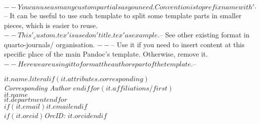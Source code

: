 $-- You can use as many custom partials as you need. Convention is to prefix name with '_'
$-- It can be useful to use such template to split some template parts in smaller pieces, which is easier to reuse. 
$-- This '_custom.tex' is used on 'title.tex' as example.
$-- See other existing format in quarto-journals/ organisation.
$-- %
$-- Use it if you need to insert content at this specific place of the main Pandoc's template. Otherwise, remove it.
$-- Here we are using it to format the authors part of the template.
$-- %

$it.name.literal$$if(it.attributes.corresponding)$\\ \itshape{Corresponding Author} $endif$$for(it.affiliations/first)$\\$it.name$\\$it.department$$endfor$\\$if(it.email)$\href{mailto:$it.email$}{$it.email$}$endif$\\$if(it.orcid)$OrcID: $it.orcid$$endif$